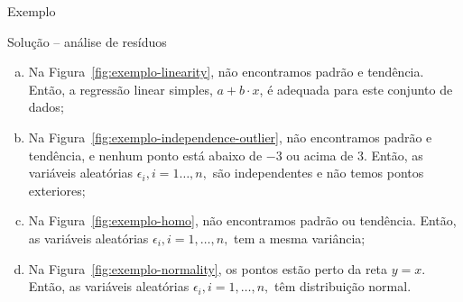 \documentclass[8pt]{beamer}
\begin{document}
\begin{frame}{Exemplo}

\begin{block}{Solução -- análise de resíduos}
	\begin{enumerate}[(a)]
		\item Na Figura~\ref{fig:exemplo-linearity}, não encontramos padrão e tendência. Então, a regressão linear simples, $a + b \cdot x$, é adequada para este conjunto de dados;
		\item Na Figura~\ref{fig:exemplo-independence-outlier}, não encontramos padrão e tendência, e nenhum ponto está abaixo de $-3$ ou acima de $3$. Então, as variáveis aleatórias $\epsilon_i,i=1 \dots, n,$ são independentes e não temos pontos exteriores;
		\item Na Figura~\ref{fig:exemplo-homo}, não encontramos padrão ou tendência. Então, as variáveis aleatórias $\epsilon_i, i=1, \dots, n,$ tem a mesma variância;
		\item Na Figura~\ref{fig:exemplo-normality}, os pontos estão perto da reta $y=x$. Então, as variáveis aleatórias $\epsilon_i, i=1, \dots, n,$ têm distribuição normal.
	\end{enumerate}
\end{block}

\end{frame}
\end{document}
